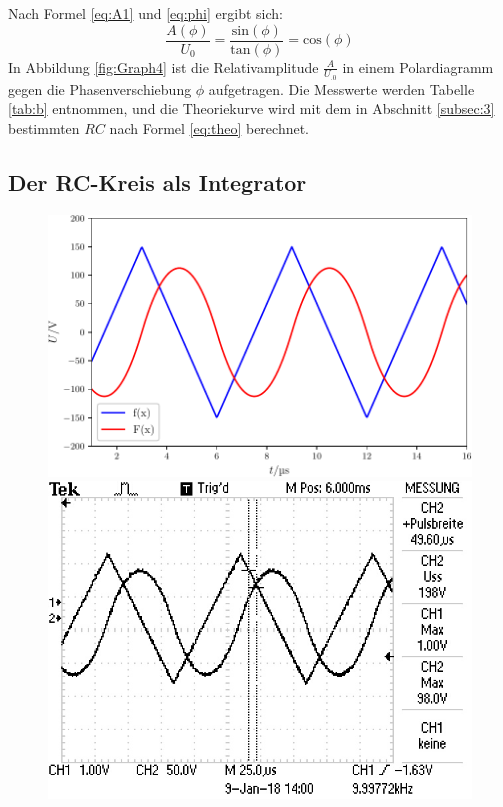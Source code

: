 \noindent Nach Formel \eqref{eq:A1} und \eqref{eq:phi} ergibt sich:
\begin{equation}
\frac{A(\phi)}{U_0}=\frac{\mathrm{sin}(\phi)}{\mathrm{tan}(\phi)}=\mathrm{cos}(\phi) \label{eq:theo}
\end{equation}
In Abbildung \ref{fig:Graph4} ist die Relativamplitude $\frac{A}{U_.0}$ in einem Polardiagramm gegen die Phasenverschiebung $\phi$ aufgetragen. Die Messwerte werden Tabelle \ref{tab:b} entnommen, und die Theoriekurve wird mit dem in Abschnitt \ref{subsec:3} bestimmten $RC$ nach Formel \eqref{eq:theo} berechnet. 

\subsection{Der RC-Kreis als Integrator}
\begin{figure}
\centering
\begin{minipage}{0.48\textwidth}
\centering
\includegraphics[width=\linewidth-10pt,height=\textheight-10pt,keepaspectratio]{content/images/Graph5.pdf}
\end{minipage}
\begin{minipage}{0.48\textwidth}
\centering
\includegraphics[width=\linewidth-10pt,height=\textheight-10pt,keepaspectratio]{content/images/5.jpg}
\end{minipage}


\end{figure}
